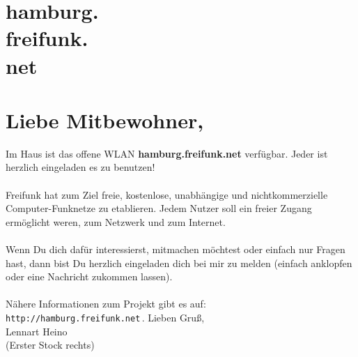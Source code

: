 \documentclass[%
paper=A4, %
pagesize, %
DIV=calc, %
ngerman,   %
16pt,
parskip
]{scrartcl}  %
\begin{document}
\section*{\Huge hamburg.\\freifunk.\\net}

\section*{Liebe Mitbewohner,}
Im Haus ist das offene WLAN \textbf{hamburg.freifunk.net} verfügbar. Jeder ist
herzlich eingeladen es zu benutzen!\\
\\
Freifunk hat zum Ziel freie, kostenlose, unabhängige und nichtkommerzielle
Computer-Funknetze zu etablieren. Jedem Nutzer soll ein freier Zugang
ermöglicht weren, zum Netzwerk und zum Internet.\\
\\
Wenn Du dich dafür interessierst, mitmachen möchtest oder einfach nur Fragen
hast, dann bist Du herzlich eingeladen dich bei mir zu melden (einfach
anklopfen oder eine Nachricht zukommen lassen).\\
\\
Nähere Informationen zum Projekt gibt es auf:\\
\texttt{\small http://hamburg.freifunk.net}\,.
\vfill
Lieben Gruß,\\
Lennart Heino\\
(Erster Stock rechts)
\end{document}
